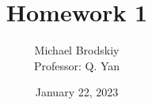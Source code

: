 


\title{Homework 1}
\date{January 22, 2023}
\author{Michael Brodskiy\\ \small Professor: Q. Yan}



\maketitle

\newpage

